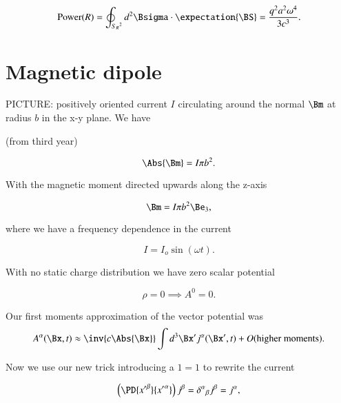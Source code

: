 \begin{equation}\label{eqn:relativisticElectrodynamicsT8:50}
\text{Power}(R) = \oint_{{S_R}^2} d^2 \Bsigma \cdot \expectation{\BS} = \frac{ q^2 a^2 \omega^4 }{3 c^3}.
\end{equation}

\section{Magnetic dipole}

PICTURE: positively oriented current $I$ circulating around the normal $\Bm$ at radius $b$ in the x-y plane.  We have

(from third year)

\begin{equation}\label{eqn:relativisticElectrodynamicsT8:70}
\Abs{\Bm} = I \pi b^2.
\end{equation}

With the magnetic moment directed upwards along the z-axis

\begin{equation}\label{eqn:relativisticElectrodynamicsT8:71}
\Bm = I \pi b^2 \Be_3,
\end{equation}

where we have a frequency dependence in the current

\begin{equation}\label{eqn:relativisticElectrodynamicsT8:72}
I = I_o \sin(\omega t).
\end{equation}

With no static charge distribution we have zero scalar potential

\begin{equation}\label{eqn:relativisticElectrodynamicsT8:90}
\rho = 0 \implies A^0 = 0.
\end{equation}

Our first moments approximation of the vector potential was
\begin{equation}\label{eqn:relativisticElectrodynamicsT8:110}
A^\alpha(\Bx, t) \approx \inv{c \Abs{\Bx}} \int d^3 \Bx' j^\alpha(\Bx', t) + O(\text{higher moments}).
\end{equation}

Now we use our new trick introducing a $1 = 1$ to rewrite the current

\begin{equation}\label{eqn:relativisticElectrodynamicsT8:130}
\left( \PD{{x'}^\beta}{{x'}^\alpha} \right) j^\beta = {\delta^\alpha}_\beta j^\beta = j^\alpha,
\end{equation}

